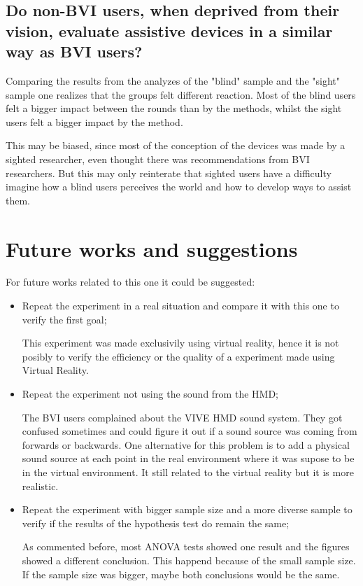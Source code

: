 \subsection*{Do non-BVI users, when deprived from their vision, evaluate assistive devices in a similar way as BVI users?}

Comparing the results from the analyzes of the "blind" sample and the "sight" sample one realizes that the groups felt different reaction. Most of the blind users felt a bigger impact between the rounds than by the methods, whilst the sight users felt a bigger impact by the method.

This may be biased, since most of the conception of the devices was made by a sighted researcher, even thought there was recommendations from BVI researchers. But this may only reinterate that sighted users have a difficulty imagine how a blind users perceives the world and how to develop ways to assist them.



\section{Future works and suggestions}

For future works related to this one it could be suggested:

\begin{itemize}
    \item Repeat the experiment in a real situation and compare it with this one to verify the first goal;
    
    This experiment was made exclusivily using virtual reality, hence it is not posibly to verify the efficiency or the quality of a experiment made using Virtual Reality.

    \item Repeat the experiment not using the sound from the HMD;
     
    The BVI users complained about the VIVE HMD sound system. They got confused sometimes and could figure it out if a sound source was coming from forwards or backwards. One alternative for this problem is to add a physical sound source at each point in the real environment where it was supose to be in the virtual environment. It still related to the virtual reality but it is more realistic. 

    \item Repeat the experiment with bigger sample size and a more diverse sample to verify if the results of the hypothesis test do remain the same;
    
    As commented before, most ANOVA tests showed one result and the figures showed a different conclusion. This happend because of the small sample size. If the sample size was bigger, maybe both conclusions would be the same.

\end{itemize}